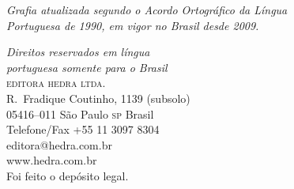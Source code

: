 \bigskip
\textit{Grafia atualizada segundo o Acordo Ortográfico da Língua\\
Portuguesa de 1990, em vigor no Brasil desde 2009.}\\

\bigskip
	

\vfill
\textit{Direitos reservados em língua\\ 
portuguesa somente para o Brasil}\\

\textsc{editora hedra ltda.}\\
R.~Fradique Coutinho, 1139 (subsolo)\\
05416--011 São Paulo \textsc{sp} Brasil\\
Telefone/Fax +55 11 3097 8304\\\smallskip
editora@hedra.com.br\\
www.hedra.com.br\\

Foi feito o depósito legal.

\endgroup
\pagebreak